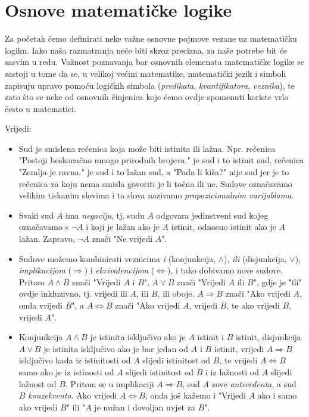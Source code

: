 \section{Osnove matematičke logike}
Za početak ćemo definirati neke važne osnovne pojmove vezane uz matematičku logiku. Iako naša razmatranja neće biti skroz precizna, za naše potrebe bit će sasvim u redu. Važnost poznavanja bar osnovnih elemenata matematičke logike se sastoji u tome da se, u velikoj većini matematike, matematički jezik i simboli zapisuju upravo pomoću logičkih simbola (\textit{predikata}, \textit{kvantifikatora}, \textit{veznika}), te zato što se neke od osnovnih činjenica koje ćemo ovdje spomenuti koriste vrlo često u matematici.

\begin{definition} Vrijedi:
\label{first}
\begin{itemize}

\item Sud je smislena rečenica koja može biti istinita ili lažna. Npr. rečenica "Postoji beskonačno mnogo prirodnih brojeva." je sud i to istinit sud, rečenica "Zemlja je ravna." je sud i to lažan sud, a "Pada li kiša?" nije sud jer je to rečenica za koju nema smisla govoriti je li točna ili ne. Sudove označavamo velikim tiskanim slovima i ta slova nazivamo \textit{propozicionalnim varijablama}.
\item Svaki sud $A$ ima \textit{negaciju}, tj. sudu $A$ odgovara jedinstveni sud kojeg označavamo s $\neg A$ i koji je lažan ako je $A$ istinit, odnosno istinit ako je $A$ lažan. Zapravo, $\neg A$ znači "Ne vrijedi $A$".
\item Sudove možemo kombinirati veznicima \textit{i} (konjunkcija, $\wedge$), \textit{ili} (disjunkcija, $\vee$), \textit{implikacijom} ($\Rightarrow$) i \textit{ekvivalencijom} ($\Leftrightarrow$), i tako dobivamo nove sudove. Pritom $A\wedge B$ znači "Vrijedi $A$ i $B$", $A\vee B$ znači "Vrijedi $A$ ili $B$", gdje je "ili" ovdje inkluzivno, tj. vrijedi ili $A$, ili $B$, ili oboje. $A\Rightarrow B$ znači "Ako vrijedi $A$, onda vrijedi $B$", a $A\Leftrightarrow B$ znači "Ako vrijedi $A$, vrijedi $B$, te ako vrijedi $B$, vrijedi $A$".
\item Konjunkcija $A\wedge B$ je istinita isključivo ako je $A$ istinit i $B$ istinit, disjunkcija $A\vee B$ je istinita isključivo ako je bar jedan od $A$ i $B$ istinit, vrijedi $A\Rightarrow B$ isključivo kada iz istinitosti od $A$ slijedi istinitost od $B$, te vrijedi $A\Leftrightarrow B$ samo ako je iz istinosti od $A$ slijedi istinitost od $B$ i iz lažnosti od $A$ slijedi lažnost od $B$. Pritom se u implikaciji $A\Rightarrow B$, sud $A$ zove \textit{antecedenta}, a sud $B$ \textit{konzekventa}. Ako vrijedi $A\Leftrightarrow B$, onda još kažemo i "Vrijedi $A$ ako i samo ako vrijedi $B$" ili "$A$ je nužan i dovoljan uvjet za $B$".
\end{itemize}
\end{definition}

